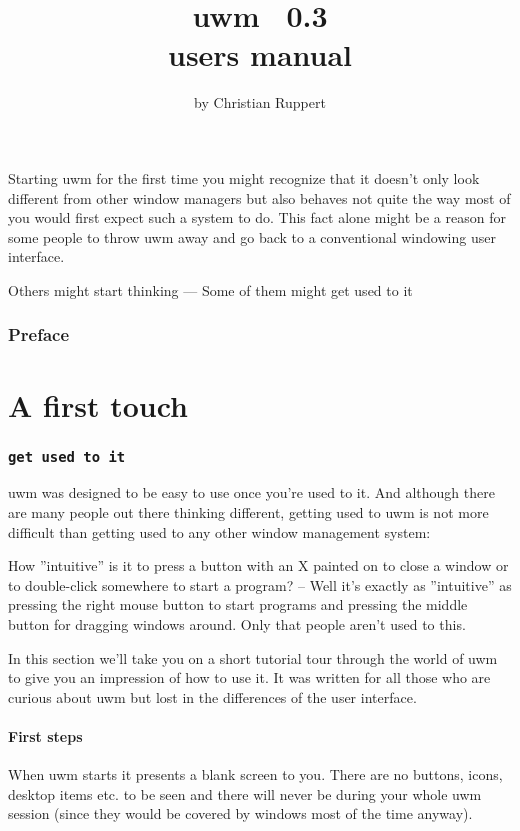 \documentclass[10pt,a4paper]{article}
\newcommand{\uwm}{{\sc uwm} }
\begin{document}
\begin{titlepage}
\title{{\Huge \uwm~0.3}\\ users manual}
\author{by Christian Ruppert}
\maketitle
{}
\vfill
\parbox{12cm}{Starting \uwm for the first time you might recognize that it doesn't only look different from other window managers but also behaves not quite the way most of you would first expect such a system to do. This fact alone might be a reason for some people to throw \uwm away and go back to a conventional windowing user interface.\smallskip

Others might start thinking \hfill --- \hfill Some of them might \textsf{get used to it}}
\thispagestyle{empty}
\pagebreak
\end{titlepage}
\tableofcontents
\pagebreak
\section*{Preface}

\part{A first touch}
\section{\texttt{get used to it}}
\uwm was designed to be easy to use once you're used to it. And although there are many people out there thinking different, getting used to \uwm is not more difficult than getting used to  any other window management system:

How ''intuitive'' is it to press a button with an \textsf{X} painted on to close a window or to double-click somewhere to start a program? -- Well it's exactly as ''intuitive'' as pressing the right mouse button to start programs and pressing the middle button for dragging windows around. Only that people aren't used to this.

In this section we'll take you on a short tutorial tour through the world of \uwm to give you an impression of how to use it. It was written for all those who are curious about \uwm but lost in the differences of the user interface.

\subsection{First steps}
When \uwm starts it presents a blank screen to you. There are no buttons, icons, desktop items etc. to be seen and there will never be during your whole \uwm session (since they would be covered by windows most of the time anyway).
\end{document}
